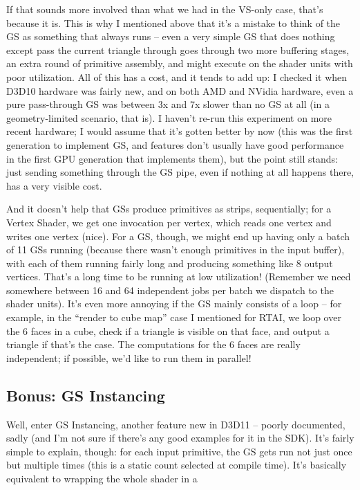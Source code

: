 \documentclass[12pt]{article}
\begin{document}
If that sounds more involved than what we had in the VS-only case, that’s because it is. This is why I mentioned above that it’s a mistake to think of the GS as something that always runs – even a very simple GS that does nothing except pass the current triangle through goes through two more buffering stages, an extra round of primitive assembly, and might execute on the shader units with poor utilization. All of this has a cost, and it tends to add up: I checked it when D3D10 hardware was fairly new, and on both AMD and NVidia hardware, even a pure pass-through GS was between 3x and 7x slower than no GS at all (in a geometry-limited scenario, that is). I haven’t re-run this experiment on more recent hardware; I would assume that it’s gotten better by now (this was the first generation to implement GS, and features don’t usually have good performance in the first GPU generation that implements them), but the point still stands: just sending something through the GS pipe, even if nothing at all happens there, has a very visible cost.

And it doesn’t help that GSs produce primitives as strips, sequentially; for a Vertex Shader, we get one invocation per vertex, which reads one vertex and writes one vertex (nice). For a GS, though, we might end up having only a batch of 11 GSs running (because there wasn’t enough primitives in the input buffer), with each of them running fairly long and producing something like 8 output vertices. That’s a long time to be running at low utilization! (Remember we need somewhere between 16 and 64 independent jobs per batch we dispatch to the shader units). It’s even more annoying if the GS mainly consists of a loop – for example, in the “render to cube map” case I mentioned for RTAI, we loop over the 6 faces in a cube, check if a triangle is visible on that face, and output a triangle if that’s the case. The computations for the 6 faces are really independent; if possible, we’d like to run them in parallel!

\subsection{Bonus: GS Instancing}
\label{sec:orgf21983b}

Well, enter GS Instancing, another feature new in D3D11 – poorly documented, sadly (and I’m not sure if there’s any good examples for it in the SDK). It’s fairly simple to explain, though: for each input primitive, the GS gets run not just once but multiple times (this is a static count selected at compile time). It’s basically equivalent to wrapping the whole shader in a
\end{document}
